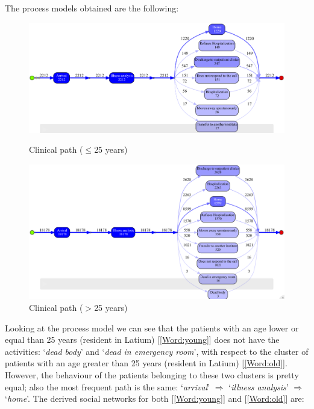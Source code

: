 \clearpage
\noindent
The process models obtained are the following:
\begin{figure} [htbp]
\includegraphics[width=\textwidth, keepaspectratio]{ProntoSoccorsoInductiveVisualMinerYoungs}
\caption{Clinical path ($\leq$25 years)}
\includegraphics[width=\textwidth, keepaspectratio]{ProntoSoccorsoInductiveVisualMinerOlds}
\caption{Clinical path ($>$25 years)}
\end{figure}
Looking at the process model we can see that the patients with an age lower or equal than 25 years (resident in Latium) [\ref{Word:young}] does not have the activities: `\textit{dead body}' and `\textit{dead in emergency room}', with respect to the cluster of patients with an age greater than 25 years (resident in Latium) [\ref{Word:old}]. However, the behaviour of the patients belonging to these two clusters is pretty equal; also the most frequent path is the same: `\textit{arrival}' $\Rightarrow$ `\textit{illness analysis}' $\Rightarrow$ `\textit{home}'.
\clearpage
\noindent
The derived social networks for both [\ref{Word:young}] and [\ref{Word:old}] are:

